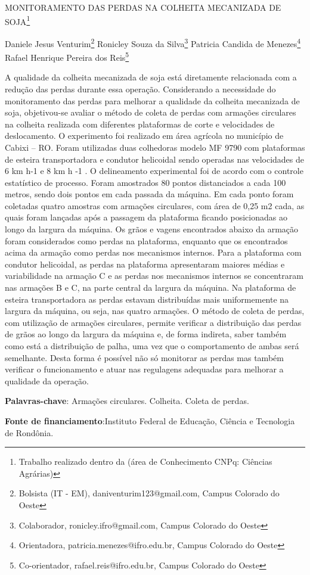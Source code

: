 \documentclass[article,12pt,onesidea,4paper,english,brazil]{abntex2}
\begin{document}
	
	
	\frenchspacing 
	
	\begin{center}
		\LARGE MONITORAMENTO DAS PERDAS NA COLHEITA MECANIZADA DE SOJA\footnote{Trabalho realizado dentro da (área de Conhecimento CNPq: Ciências Agrárias)}
		
		\normalsize
		Daniele Jesus Venturim\footnote{Bolsista (IT - EM), daniventurim123@gmail.com, Campus Colorado do Oeste} 
		Ronicley Souza da Silva\footnote{Colaborador, ronicley.ifro@gmail.com, Campus Colorado do Oeste} 
		Patricia Candida de Menezes\footnote{Orientadora, patricia.menezes@ifro.edu.br, Campus Colorado do Oeste} 
		Rafael
		Henrique Pereira dos Reis\footnote{Co-orientador, rafael.reis@ifro.edu.br, Campus Colorado do Oeste} 
	\end{center}
	
	\noindent A qualidade da colheita mecanizada de soja está diretamente relacionada com a
	redução das perdas durante essa operação. Considerando a necessidade do
	monitoramento das perdas para melhorar a qualidade da colheita mecanizada de
	soja, objetivou-se avaliar o método de coleta de perdas com armações circulares na
	colheita realizada com diferentes plataformas de corte e velocidades de
	deslocamento. O experimento foi realizado em área agrícola no município de Cabixi
	– RO. Foram utilizadas duas colhedoras modelo MF 9790 com plataformas de
	esteira transportadora e condutor helicoidal sendo operadas nas velocidades de 6
	km h-1 e 8 km h
	-1
	. O delineamento experimental foi de acordo com o controle
	estatístico de processo. Foram amostrados 80 pontos distanciados a cada 100
	metros, sendo dois pontos em cada passada da máquina. Em cada ponto foram
	coletadas quatro amostras com armações circulares, com área de 0,25 m2 cada, as
	quais foram lançadas após a passagem da plataforma ficando posicionadas ao
	longo da largura da máquina. Os grãos e vagens encontrados abaixo da armação
	foram considerados como perdas na plataforma, enquanto que os encontrados
	acima da armação como perdas nos mecanismos internos. Para a plataforma com
	condutor helicoidal, as perdas na plataforma apresentaram maiores médias e
	variabilidade na armação C e as perdas nos mecanismos internos se concentraram
	nas armações B e C, na parte central da largura da máquina. Na plataforma de
	esteira transportadora as perdas estavam distribuídas mais uniformemente na
	largura da máquina, ou seja, nas quatro armações. O método de coleta de perdas,
	com utilização de armações circulares, permite verificar a distribuição das perdas de
	grãos ao longo da largura da máquina e, de forma indireta, saber também como está
	a distribuição de palha, uma vez que o comportamento de ambas será semelhante.
	Desta forma é possível não só monitorar as perdas mas também verificar o
	funcionamento e atuar nas regulagens adequadas para melhorar a qualidade da
	operação.
	
	\vspace{\onelineskip}
	
	\noindent
	\textbf{Palavras-chave}: Armações circulares. Colheita. Coleta de perdas.
	
	\noindent
	\textbf{Fonte de financiamento}:Instituto Federal de Educação, Ciência e Tecnologia de
	Rondônia.
	
\end{document}
